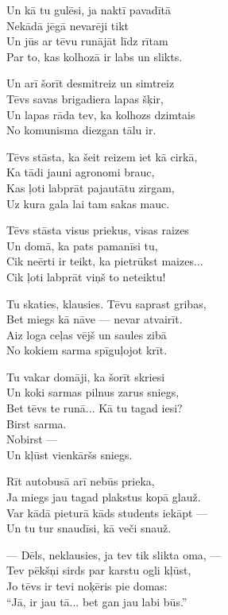 \documentclass[14pt]{extarticle}
\begin{document}
{{Un kā tu gulēsi, ja naktī pavadītā\\
Nekādā jēgā nevarēji tikt\\
Un jūs ar tēvu runājāt līdz rītam\\
Par to, kas kolhozā ir labs un slikts. 

Un arī šorīt desmitreiz un simtreiz\\
Tēvs savas brigadiera lapas šķir,\\
Un lapas rāda tev, ka kolhozs dzimtais\\
No komunisma diezgan tālu ir. 

Tēvs stāsta, ka šeit reizem iet kā cirkā,\\
Ka tādi jauni agronomi brauc,\\
Kas ļoti labprāt pajautātu zirgam,\\
Uz kura gala lai tam sakas mauc.

Tēvs stāsta visus priekus, visas raizes\\
Un domā, ka pats pamanīsi tu,\\
Cik neērti ir teikt, ka pietrūkst maizes...\\
Cik ļoti labprāt viņš to neteiktu!

Tu skaties, klausies. Tēvu saprast gribas,\\
Bet miegs kā nāve --- nevar atvairīt.\\
Aiz loga ceļas vējš un saules zibā\\
No kokiem sarma spīguļojot krīt. 

Tu vakar domāji, ka šorīt skriesi\\
Un koki sarmas pilnus zarus sniegs,\\
Bet tēvs te runā... Kā tu tagad iesi?\\
Birst sarma.\\
Nobirst ---\\
Un kļūst vienkāršs sniegs. 

Rīt autobusā arī nebūs prieka,\\
Ja miegs jau tagad plakstus kopā glauž.\\
Var kādā pieturā kāds students iekāpt ---\\
Un tu tur snaudīsi, kā veči snauž. 

--- Dēls, neklausies, ja tev tik slikta oma, ---\\
Tev pēkšņi sirds par karstu ogli kļūst,\\
Jo tēvs ir tevi noķēris pie domas:\\
``Jā, ir jau tā... bet gan jau labi būs.''

}}
\end{document}
